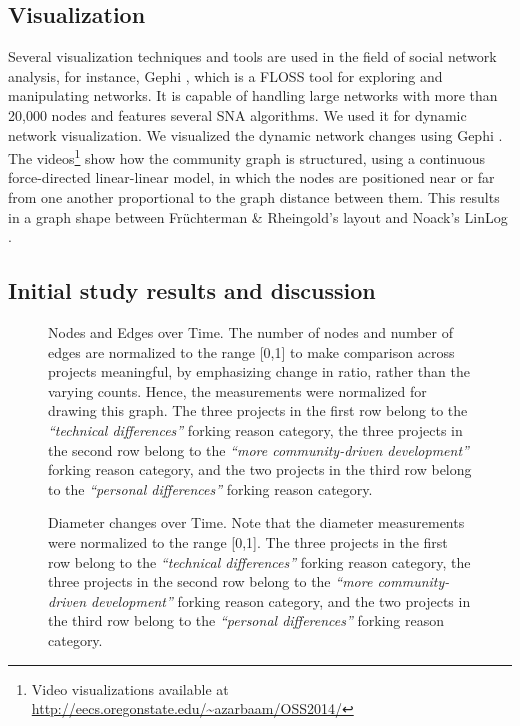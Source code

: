 \documentclass{acm_proc_article-sp}
\begin{document}
\subsection{Visualization}
Several visualization techniques and tools are used in the field of social network analysis, for instance, Gephi \cite{Bastian}, which is a FLOSS tool for exploring and manipulating networks. It is capable of handling large networks with more than 20,000 nodes and features several SNA algorithms. We used it for dynamic network visualization.
We visualized the dynamic network changes using Gephi \cite{Bastian}. The videos\footnote{\label{footnote1}Video visualizations available at \href{http://eecs.oregonstate.edu/~azarbaam/OSS2014/}{http://eecs.oregonstate.edu/\textasciitilde azarbaam/OSS2014/}} show how the community graph is structured, using a continuous force-directed linear-linear model, in which the nodes are positioned near or far from one another proportional to the graph distance between them. This results in a graph shape between Fr\"{u}chterman \& Rheingold's \cite{Fruchterman} layout and Noack's LinLog \cite{Noack}.


\subsection{Initial study results and discussion}
\label{results}

\begin{figure}[!Ht]
\centering
{}
\caption{Nodes and Edges over Time. The number of nodes and number of edges are normalized to the range [0,1] to make comparison across projects meaningful, by emphasizing change in ratio, rather than the varying counts. Hence, the measurements were normalized for drawing this graph. The three projects in the first row belong to the \textit{``technical differences''} forking reason category, the three projects in the second row belong to the \textit{``more community-driven development''} forking reason category, and the two projects in the third row belong to the \textit{``personal differences''} forking reason category.}
\label{figureNodesEdgesTimeR}
\end{figure}

\begin{figure}[!Ht]
\centering
{}
\caption{Diameter changes over Time. Note that the diameter measurements were normalized to the range [0,1]. The three projects in the first row belong to the \textit{``technical differences''} forking reason category, the three projects in the second row belong to the \textit{``more community-driven development''} forking reason category, and the two projects in the third row belong to the \textit{``personal differences''} forking reason category.}
\label{figureDiameterTimeR}
\end{figure}
\end{document}

